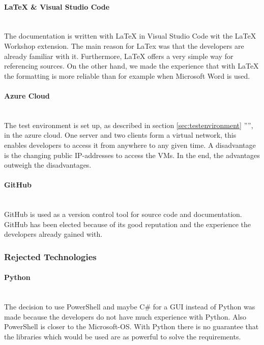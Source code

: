 \paragraph{LaTeX \& Visual Studio Code}\ \\
The documentation is written with LaTeX in Visual Studio Code wit the LaTeX Workshop extension. The main reason for LaTex was that the developers are already familiar with it. Furthermore, LaTeX offers a very simple way for referencing sources. On the other hand, we made the experience that with LaTeX the formatting is more reliable than for example when Microsoft Word is used.

\paragraph{Azure Cloud}\ \\
The test environment is set up, as described in section \ref{sec:testenvironment} '''', in the azure cloud. One server and two clients form a virtual network, this enables developers to access it from anywhere to any given time. A disadvantage is the changing public IP-addresses to access the VMs. In the end, the advantages outweigh the disadvantages.

\paragraph{GitHub}\ \\
GitHub is used as a version control tool for source code and documentation. GitHub has been elected because of its good reputation and the experience the developers already gained with.

\subsubsection{Rejected Technologies}

\paragraph{Python}\ \\
The decision to use PowerShell and maybe C\# for a GUI instead of Python was made because the developers do not have much experience with Python. Also PowerShell is closer to the Microsoft-OS. With Python there is no guarantee that the libraries which would be used are as powerful to solve the requirements.


